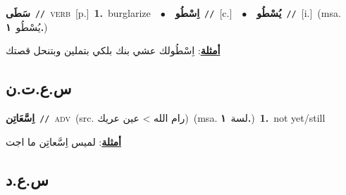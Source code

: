 \documentclass[10pt,a4paper,twoside]{article} %
\begin{document}
\begin{multicols}{2}
{\setlength\topsep{0pt}\textbf{\foreignlanguage{arabic}{سَطَى}}\ {\color{gray}\texttt{//}\color{black}}\ \textsc{verb}\ [p.]\ \textbf{1.}~burglarize\ \ $\bullet$\ \ \setlength\topsep{0pt}\textbf{\foreignlanguage{arabic}{اِسْطُو}}\ {\color{gray}\texttt{//}\color{black}}\ [c.]\ \ $\bullet$\ \ \setlength\topsep{0pt}\textbf{\foreignlanguage{arabic}{يُسْطُو}}\ {\color{gray}\texttt{//}\color{black}}\ [i.]\ \color{gray}(msa. \foreignlanguage{arabic}{يُسْطُو}~\foreignlanguage{arabic}{\textbf{١.}})\color{black}\  \begin{flushright}\color{gray}\foreignlanguage{arabic}{\textbf{\underline{\foreignlanguage{arabic}{أمثلة}}}: اِسْطُولك عشي بنك بلكي بتملين وبتنحل قصتك}\end{flushright}\color{black}} \vspace{2mm}

\vspace{-3mm}
\subsection*{\color{blue}\foreignlanguage{arabic}{س.ع.ت.ن}\color{blue}{ (ntws)}} 

{\setlength\topsep{0pt}\textbf{\foreignlanguage{arabic}{اِسَّعَاتِن}}\ {\color{gray}\texttt{//}\color{black}}\ \textsc{adv}\ (src. \color{gray}\foreignlanguage{arabic}{رام الله > عين عريك}\color{black})\ \color{gray}(msa. \foreignlanguage{arabic}{لسة}~\foreignlanguage{arabic}{\textbf{١.}})\color{black}\ \textbf{1.}~not yet/still\  \begin{flushright}\color{gray}\foreignlanguage{arabic}{\textbf{\underline{\foreignlanguage{arabic}{أمثلة}}}: لميس اِسَّعاتِن ما اجت}\end{flushright}\color{black}} \vspace{2mm}

\vspace{-3mm}
\subsection*{\color{blue}\foreignlanguage{arabic}{س.ع.د}\color{blue}{}} 


\end{multicols}
\end{document}
